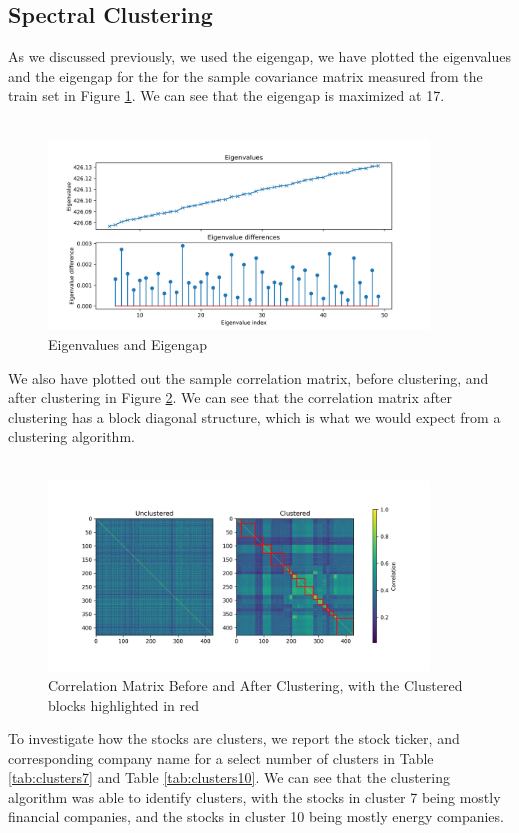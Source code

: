 \documentclass[10pt]{article}
\begin{document}
\subsection{Spectral Clustering}
As we discussed previously, we used the eigengap, we have plotted the eigenvalues and the eigengap for the 
for the sample covariance matrix measured from the train set in Figure \ref{fig:eigenvalues_and_eigengap}. We can see that the eigengap is maximized at 17.\\\\
\begin{figure}[t]
    \centering
    \includegraphics[width=0.9\textwidth]{../eigenvalues.png}
    \caption{Eigenvalues and Eigengap}
    \label{fig:eigenvalues_and_eigengap}
\end{figure}
We also have plotted out the sample correlation matrix, before clustering, and after clustering in Figure \ref{fig:correlation_matrix}. We can see that the correlation matrix after clustering has a block diagonal structure, which is what we would expect from a clustering algorithm.\\\\
\begin{figure}[t]
    \centering
    \includegraphics[width=0.9\textwidth]{../clustered_corr.png}
    \caption{Correlation Matrix Before and After Clustering, with the Clustered blocks highlighted in red}
    \label{fig:correlation_matrix}
\end{figure}
To investigate how the stocks are clusters, we report the stock ticker, and corresponding company name for a select 
number of clusters in Table \ref{tab:clusters7} and Table \ref{tab:clusters10}. We can see that the clustering algorithm was able to identify clusters,
with the stocks in cluster 7 being mostly financial companies, and the stocks in cluster 10 being mostly energy companies.\\\\
\end{document}

